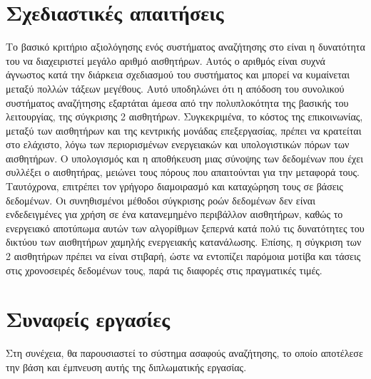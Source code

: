\section{Σχεδιαστικές απαιτήσεις}
Το βασικό κριτήριο αξιολόγησης ενός συστήματος αναζήτησης στο  είναι η δυνατότητα του να διαχειριστεί μεγάλο αριθμό αισθητήρων.
Αυτός ο αριθμός είναι συχνά άγνωστος κατά την διάρκεια σχεδιασμού του συστήματος και μπορεί να κυμαίνεται μεταξύ πολλών τάξεων μεγέθους.
Αυτό υποδηλώνει ότι η απόδοση του συνολικού συστήματος αναζήτησης εξαρτάται άμεσα από την πολυπλοκότητα της βασικής του λειτουργίας, της σύγκρισης 2 αισθητήρων.
Συγκεκριμένα, το κόστος της επικοινωνίας, μεταξύ των αισθητήρων και της κεντρικής μονάδας επεξεργασίας, πρέπει να κρατείται στο ελάχιστο, λόγω των περιορισμένων ενεργειακών και υπολογιστικών πόρων των αισθητήρων.
O υπολογισμός και η αποθήκευση μιας σύνοψης των δεδομένων που έχει συλλέξει ο αισθητήρας, μειώνει τους πόρους που απαιτούνται για την μεταφορά τους. Ταυτόχρονα, επιτρέπει τον γρήγορο διαμοιρασμό και καταχώρηση τους σε βάσεις δεδομένων.
Οι συνηθισμένοι μέθοδοι σύγκρισης ροών δεδομένων δεν είναι ενδεδειγμένες για χρήση σε ένα κατανεμημένο περιβάλλον αισθητήρων, καθώς το ενεργειακό αποτύπωμα αυτών των αλγορίθμων ξεπερνά κατά πολύ τις δυνατότητες του δικτύου των αισθητήρων χαμηλής ενεργειακής κατανάλωσης.
Επίσης, η σύγκριση των 2 αισθητήρων πρέπει να είναι στιβαρή, ώστε να εντοπίζει παρόμοια μοτίβα και τάσεις στις χρονοσειρές δεδομένων τους, παρά τις διαφορές στις πραγματικές τιμές.
\section{Συναφείς εργασίες} \label{Related works}
Στη συνέχεια, θα παρουσιαστεί το σύστημα ασαφούς αναζήτησης\cite{Truong2012}\cite{Truong2013}, το οποίο αποτέλεσε την βάση και έμπνευση αυτής της διπλωματικής εργασίας.
\par
